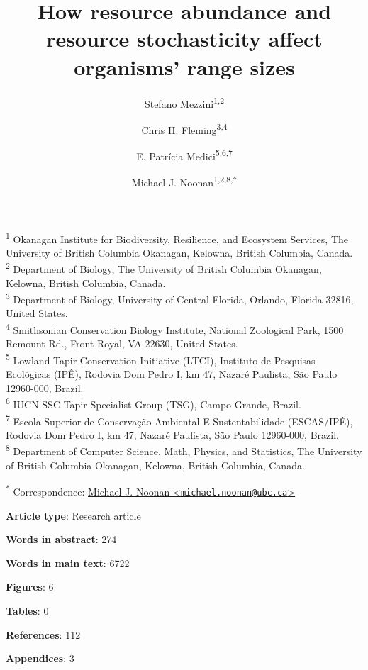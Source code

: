 \documentclass[
  12pt,
]{article}
\title{\large How resource abundance and resource stochasticity affect organisms' range sizes}
\author{Stefano Mezzini\textsuperscript{1,2} \and Chris H. Fleming\textsuperscript{3,4} \and E. Patrícia Medici\textsuperscript{5,6,7} \and Michael J. Noonan\textsuperscript{1,2,8,*}}
\date{}
\begin{document}
\maketitle

\textsuperscript{1} Okanagan Institute for Biodiversity, Resilience, and Ecosystem Services, The University of British Columbia Okanagan, Kelowna, British Columbia, Canada.\\
\textsuperscript{2} Department of Biology, The University of British Columbia Okanagan, Kelowna, British Columbia, Canada.\\
\textsuperscript{3} Department of Biology, University of Central Florida, Orlando, Florida 32816, United States.\\
\textsuperscript{4} Smithsonian Conservation Biology Institute, National Zoological Park, 1500 Remount Rd., Front Royal, VA 22630, United States.\\
\textsuperscript{5} Lowland Tapir Conservation Initiative (LTCI), Instituto de Pesquisas Ecológicas (IPÊ), Rodovia Dom Pedro I, km 47, Nazaré Paulista, São Paulo 12960-000, Brazil.\\
\textsuperscript{6} IUCN SSC Tapir Specialist Group (TSG), Campo Grande, Brazil.\\
\textsuperscript{7} Escola Superior de Conservação Ambiental E Sustentabilidade (ESCAS/IPÊ), Rodovia Dom Pedro I, km 47, Nazaré Paulista, São Paulo 12960-000, Brazil.\\
\textsuperscript{8} Department of Computer Science, Math, Physics, and Statistics, The University of British Columbia Okanagan, Kelowna, British Columbia, Canada.

\textsuperscript{*} Correspondence: \href{mailto:michael.noonan@ubc.ca}{Michael J. Noonan \textless{}\href{mailto:michael.noonan@ubc.ca}{\nolinkurl{michael.noonan@ubc.ca}}\textgreater{}}

\newcommand*\e{\text{E}}

\newcommand*\var{\text{Var}}

\clearpage

\noindent \textbf{Article type}: Research article

\noindent \textbf{Words in abstract}: 274

\noindent \textbf{Words in main text}: 6722

\noindent \textbf{Figures}: 6

\noindent \textbf{Tables}: 0

\noindent \textbf{References}: 112

\noindent \textbf{Appendices}: 3
\end{document}
